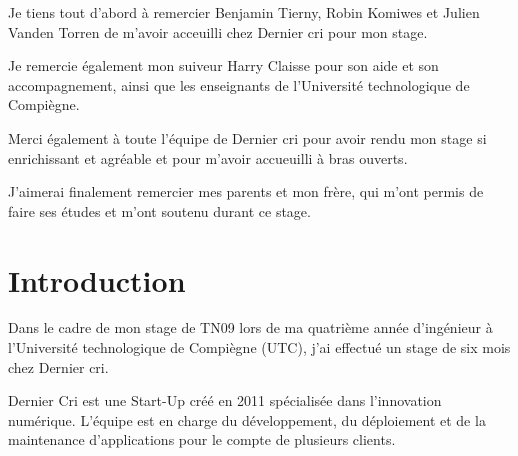 \documentclass[12pt,a4paper]{article}
\begin{document}
  \bigskip

  Je tiens tout d'abord à remercier Benjamin Tierny, Robin Komiwes et
  Julien Vanden Torren de m'avoir acceuilli chez Dernier cri pour mon
  stage.

  \bigskip

  Je remercie également mon suiveur Harry Claisse pour son aide et son
  accompagnement, ainsi que les enseignants de l'Université technologique
  de Compiègne.

  \bigskip

  Merci également à toute l'équipe de Dernier cri pour avoir rendu mon
  stage si enrichissant et agréable et pour m'avoir accueuilli à bras
  ouverts.

  \bigskip

  J'aimerai finalement remercier mes parents et mon frère, qui m'ont
  permis de faire ses études et m'ont soutenu durant ce stage.

  \newpage

  \section{Introduction}\label{introduction}

  \bigskip

  Dans le cadre de mon stage de TN09 lors de ma quatrième année
  d'ingénieur à l'Université technologique de Compiègne (UTC), j'ai
  effectué un stage de six mois chez Dernier cri.

  \bigskip

  Dernier Cri est une Start-Up créé en 2011 spécialisée dans l'innovation
  numérique. L'équipe est en charge du développement, du déploiement et de
  la maintenance d'applications pour le compte de plusieurs clients.
\end{document}
